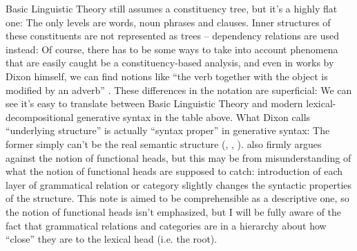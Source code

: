 \documentclass[UTF8, a4paper, oneside, scheme=plain]{ctexrep}
\newcommand*{\citepage}[1]{pp.~{#1}}
\begin{document}
Basic Linguistic Theory still assumes a constituency tree,
but it's a highly flat one:
The only levels are words, noun phrases and clauses.
Inner structures of these constituents are not represented as trees -- 
dependency relations are used instead:
Of course, there has to be some ways 
to take into account phenomena that are easily caught be a constituency-based analysis,
and even in works by Dixon himself,
we can find notions like ``the verb together with the object is modified by an adverb''
\citep[\citepage{376}]{dixon2005semantic}.
These differences in the notation are superficial:
We can see it's easy to translate between Basic Linguistic Theory 
and modern lexical-decompositional generative syntax
in the table above.
What Dixon calls ``underlying structure'' is actually ``syntax proper'' in generative syntax:
The former simply can't be the real semantic structure 
(, ,
).
\citet{dixon2009basic1} also firmly argues against the notion of functional heads,
but this may be from misunderstanding of what the notion of functional heads are supposed to catch:
introduction of each layer of grammatical relation or category slightly changes 
the syntactic properties of the structure.
This note is aimed to be comprehensible as a descriptive one,
so the notion of functional heads isn't emphasized,
but I will be fully aware of the fact that 
grammatical relations and categories are in a hierarchy 
about how ``close'' they are to the lexical head (i.e. the root).
\end{document}
